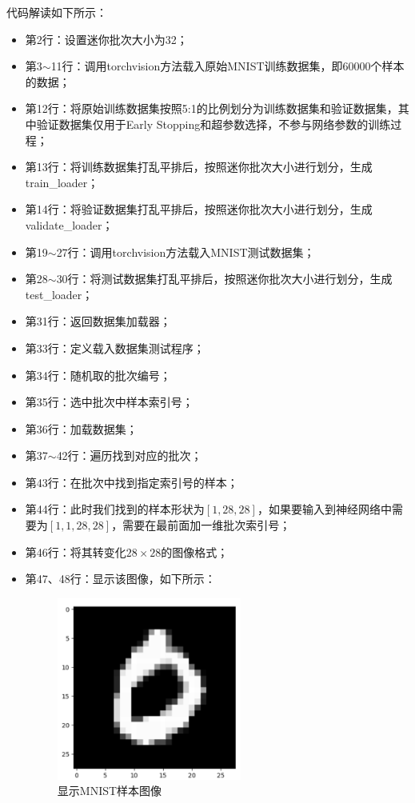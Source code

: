 \documentclass[UTF8]{article}
\begin{document}
代码解读如下所示：
\begin{itemize}
\item 第2行：设置迷你批次大小为32；
\item 第3$\sim$11行：调用torchvision方法载入原始MNIST训练数据集，即60000个样本的数据；
\item 第12行：将原始训练数据集按照5:1的比例划分为训练数据集和验证数据集，其中验证数据集仅用于Early Stopping和超参数选择，不参与网络参数的训练过程；
\item 第13行：将训练数据集打乱平排后，按照迷你批次大小进行划分，生成train\_loader；
\item 第14行：将验证数据集打乱平排后，按照迷你批次大小进行划分，生成validate\_loader；
\item 第19$\sim$27行：调用torchvision方法载入MNIST测试数据集；
\item 第28$\sim$30行：将测试数据集打乱平排后，按照迷你批次大小进行划分，生成test\_loader；
\item 第31行：返回数据集加载器；
\item 第33行：定义载入数据集测试程序；
\item 第34行：随机取的批次编号；
\item 第35行：选中批次中样本索引号；
\item 第36行：加载数据集；
\item 第37$\sim$42行：遍历找到对应的批次；
\item 第43行：在批次中找到指定索引号的样本；
\item 第44行：此时我们找到的样本形状为$[1, 28, 28]$，如果要输入到神经网络中需要为$[1, 1, 28, 28]$，需要在最前面加一维批次索引号；
\item 第46行：将其转变化$28 \times 28$的图像格式；
\item 第47、48行：显示该图像，如下所示：
\begin{figure}[H]
	\caption{显示MNIST样本图像}
	\label{f000074}
	\centering
	\includegraphics[height=6cm]{images/f000074}
\end{figure}
\end{itemize}
\end{document}

